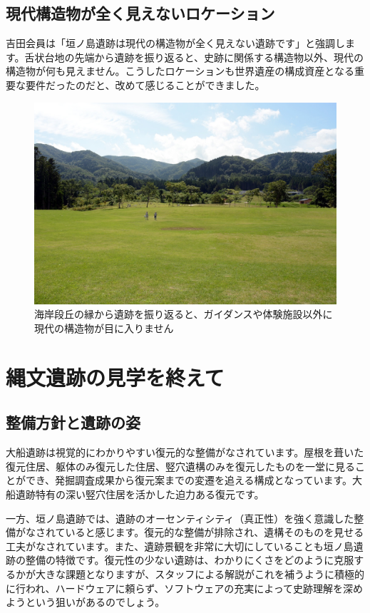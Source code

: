 \documentclass[a4j,11pt,twocolumn,openany]{jsbook}
\begin{document}
\subsection{現代構造物が全く見えないロケーション}

吉田会員は「垣ノ島遺跡は現代の構造物が全く見えない遺跡です」と強調します。舌状台地の先端から遺跡を振り返ると、史跡に関係する構造物以外、現代の構造物が何も見えません。こうしたロケーションも世界遺産の構成資産となる重要な要件だったのだと、改めて感じることができました。

\begin{figure}[ht]
	\centering
	\includegraphics[width=\linewidth]{fig/01_Iseki_kengaku/18Kakinosima_zenkei02.JPG}
	\caption{
		海岸段丘の縁から遺跡を振り返ると、ガイダンスや体験施設以外に現代の構造物が目に入りません}
	\label{}
\end{figure}

\section{縄文遺跡の見学を終えて}

\subsection{整備方針と遺跡の姿}
大船遺跡は視覚的にわかりやすい復元的な整備がなされています。屋根を葺いた復元住居、躯体のみ復元した住居、竪穴遺構のみを復元したものを一堂に見ることができ、発掘調査成果から復元案までの変遷を追える構成となっています。大船遺跡特有の深い竪穴住居を活かした迫力ある復元です。

一方、垣ノ島遺跡では、遺跡のオーセンティシティ（真正性）を強く意識した整備がなされていると感じます。復元的な整備が排除され、遺構そのものを見せる工夫がなされています。また、遺跡景観を非常に大切にしていることも垣ノ島遺跡の整備の特徴です。復元性の少ない遺跡は、わかりにくさをどのように克服するかが大きな課題となりますが、スタッフによる解説がこれを補うように積極的に行われ、ハードウェアに頼らず、ソフトウェアの充実によって史跡理解を深めようという狙いがあるのでしょう。
\end{document}
